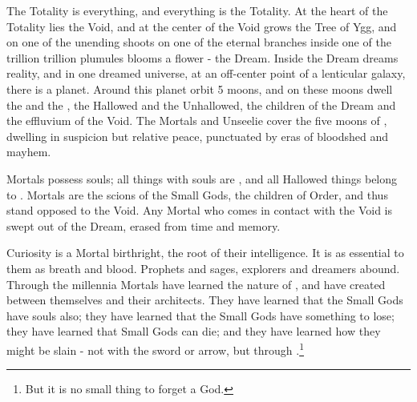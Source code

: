 


    The Totality is everything, and everything is the Totality. At the heart of the Totality lies the Void, and at the center of the Void grows the Tree of Ygg, and on one of the unending shoots on one of the eternal branches inside one of the trillion trillion plumules blooms a flower - the Dream. Inside the Dream \TheAuthority dreams reality, and in one dreamed universe, at an off-center point of a lenticular galaxy, there is a planet. Around this planet orbit 5 moons, and on these moons dwell the  and the , the Hallowed and the Unhallowed, the children of the Dream and the effluvium of the Void. The Mortals and Unseelie cover the five moons of , dwelling in suspicion but relative peace, punctuated by eras of bloodshed and mayhem. 

   Mortals possess souls; all things with souls are , and all Hallowed things belong to . Mortals are the scions of the Small Gods, the children of Order, and thus stand opposed to the Void. Any Mortal who comes in contact with the Void is swept out of the Dream, erased from time and memory.

   Curiosity is a Mortal birthright, the root of their intelligence. It is as essential to them as breath and blood. Prophets and sages, explorers and dreamers abound. Through the millennia Mortals have learned the nature of , and have created  between themselves and their architects. They have learned that the Small Gods have souls also; they have learned that the Small Gods have something to lose; they have learned that Small Gods can die; and they have learned how they might be slain - not with the sword or arrow, but through .\footnote{But it is no small thing to forget a God.}

